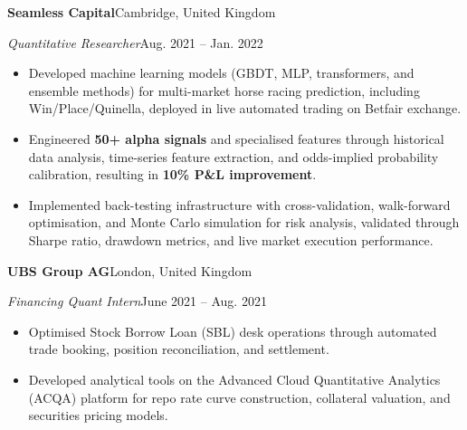 \documentclass[10pt,a4paper]{article}
\newcommand{\experience}[4]{%
    \textbf{#1}\hfill #2\par\vspace{-0.5\baselineskip}%
    \textit{#3}\hfill #4\par\vspace{-0.5\baselineskip}%
}
\begin{document}
\experience{Seamless Capital}{Cambridge, United Kingdom}
{Quantitative Researcher}{Aug. 2021 -- Jan. 2022}
\begin{itemize}
    \item Developed machine learning models (GBDT, MLP, transformers, and ensemble methods) for multi-market horse racing prediction, including Win/Place/Quinella, deployed in live automated trading on Betfair exchange.
    \item Engineered \textbf{50+ alpha signals} and specialised features through historical data analysis, time-series feature extraction, and odds-implied probability calibration, resulting in \textbf{10\% P\&L improvement}.
    \item Implemented back-testing infrastructure with cross-validation, walk-forward optimisation, and Monte Carlo simulation for risk analysis, validated through Sharpe ratio, drawdown metrics, and live market execution performance.
\end{itemize}

\experience{UBS Group AG}{London, United Kingdom}
{Financing Quant Intern}{June 2021 -- Aug. 2021}
\begin{itemize}
    \item Optimised Stock Borrow Loan (SBL) desk operations through automated trade booking, position reconciliation, and settlement.
    \item Developed analytical tools on the Advanced Cloud Quantitative Analytics (ACQA) platform for repo rate curve construction, collateral valuation, and securities pricing models.
\end{itemize}

\end{document}
